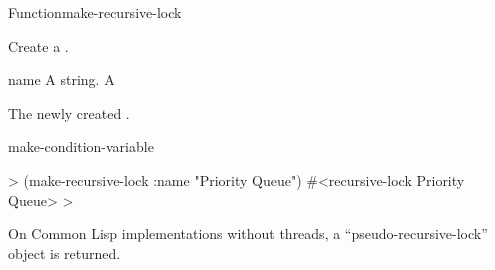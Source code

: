 \begin{functiondoc}{Function}{make-recursive-lock}{ 
    \returns{} } 
%
%
%

\fnsyntax

\fnpurpose Create a .

\fnpackage {}

\fnmodule {}

\fnargs
\begin{args}{name}
\arg[name] A string.
\arg[lock] A 
\end{args}

\fnreturns The newly created . 

\begin{alsos}{make-condition-variable}
\end{alsos}

\fnexample
%
\W\supp
\begin{example}
  > (make-recursive-lock :name "Priority Queue")
  #<recursive-lock Priority Queue>
  >
\end{example}

\fnnote On Common Lisp implementations without threads, a
``pseudo-recursive-lock'' object is returned.

\end{functiondoc}


